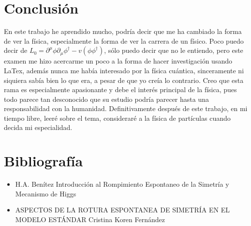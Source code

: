 \documentclass[a4paper,12pt,twoside]{book}
\begin{document}
\chapter{Conclusión}\label{cap.conclusion}
En este trabajo he aprendido mucho, podría decir que me ha cambiado la forma de ver la física, especialmente la forma de ver la carrera de un físico. Poco puedo decir de $L_{0}=\partial^{\mu}\phi\partial_{\mu}\phi^{\dagger}-v(\phi\phi^{\dagger})$, sólo puedo decir que no le entiendo, pero este examen me hizo acercarme un poco a la forma de hacer investigación usando LaTex, además nunca me había interesado por la física cuántica, sinceramente ni siquiera sabía bien lo que era, a pesar de que yo creía lo contrario. Creo que esta rama es especialmente apasionante y debe el interés principal de la física, pues todo parece tan desconocido que su estudio podría parecer hasta una responsabilidad con la humanidad. Definitivamente después de este trabajo, en mi tiempo libre, leeré sobre el tema, consideraré a la física de partículas cuando decida mi especialidad.
\chapter{Bibliografía}\label{cap.bibliografia}
\begin{itemize}
\item H.A. Benítez Introducción al Rompimiento Espontaneo de la Simetría y Mecanismo de Higgs
\item ASPECTOS DE LA ROTURA ESPONTANEA DE SIMETRÍA EN EL MODELO ESTÁNDAR  Cristina Koren Fernández
\end{itemize}
\end{document}
